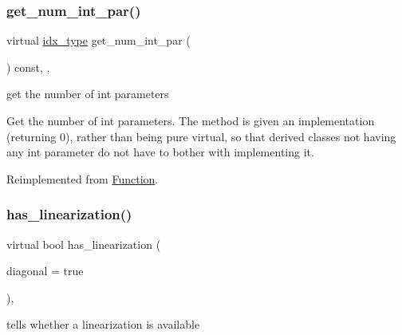 \subsubsection{\texorpdfstring{get\+\_\+num\+\_\+int\+\_\+par()}{get\_num\_int\_par()}}
{\footnotesize\ttfamily virtual \mbox{\hyperlink{class_s_m_spp__di__unipi__it_1_1_thin_compute_interface_aa3d710629ad8c434286726ad810c3b47}{idx\+\_\+type}} get\+\_\+num\+\_\+int\+\_\+par (\begin{DoxyParamCaption}\item[{void}]{ }\end{DoxyParamCaption}) const\hspace{0.3cm}{\ttfamily [inline]}, {\ttfamily [override]}, {\ttfamily [virtual]}}



get the number of int parameters 

Get the number of int parameters. The method is given an implementation (returning 0), rather than being pure virtual, so that derived classes not having any int parameter do not have to bother with implementing it. 

Reimplemented from \mbox{\hyperlink{class_s_m_spp__di__unipi__it_1_1_function_a3ad74d9506761eb2ca4c8a936fb7a1c5}{Function}}.

\mbox{\label{class_s_m_spp__di__unipi__it_1_1_c05_function_a5f49301b93b1980e945001a23d3ce2a9}} 
\subsubsection{\texorpdfstring{has\+\_\+linearization()}{has\_linearization()}}
{\footnotesize\ttfamily virtual bool has\+\_\+linearization (\begin{DoxyParamCaption}\item[{const bool}]{diagonal = {\ttfamily true} }\end{DoxyParamCaption})\hspace{0.3cm}{\ttfamily [inline]}, {\ttfamily [virtual]}}



tells whether a linearization is available 

